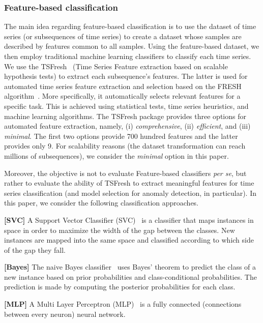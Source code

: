 \subsubsection{Feature-based classification}
The main idea regarding feature-based classification is to use the dataset of time series (or subsequences of time series) to create a dataset whose samples are described by features common to all samples. Using the feature-based dataset, we then employ traditional machine learning classifiers to classify each time series. We use the TSFresh~\cite{CHRIST201872} (Time Series Feature extraction based on scalable hypothesis tests) to extract each subsequence's features. The latter is used for automated time series feature extraction and selection based on the FRESH algorithm~\cite{christ2016distributed}. More specifically, it automatically selects relevant features for a specific task. This is achieved using statistical tests, time series heuristics, and machine learning algorithms. The TSFresh package provides three options for automated feature extraction, namely, (i) \textit{ comprehensive}, (ii) \textit{ efficient}, and (iii) \textit{ minimal}. The first two options provide 700 hundred features and the latter provides only 9. For scalability reasons (the dataset transformation can reach millions of subsequences), we consider the \textit{minimal} option in this paper.

Moreover, the objective is not to evaluate Feature-based classifiers \textit{per se}, but rather to evaluate the ability of TSFresh to extract meaningful features for time series classification (and model selection for anomaly detection, in particular). In this paper, we consider the following classification approaches.

\noindent\textbf{[SVC]}
A Support Vector Classifier (SVC)~\cite{10.1145/130385.130401} is a classifier that maps instances in space in order to maximize the width of the gap between the classes. New instances are mapped into the same space and classified according to which side of the gap they fall. 

\noindent\textbf{[Bayes]}
The naive Bayes classifier~\cite{Zhang2004TheOO} uses Bayes' theorem to predict the class of a new instance based on prior probabilities and class-conditional probabilities. The prediction is made by computing the posterior probabilities for each class.

\noindent\textbf{[MLP]}
A Multi Layer Perceptron (MLP)~\cite{Hinton1989ConnectionistLP} is a fully connected (connections between every neuron) neural network.

